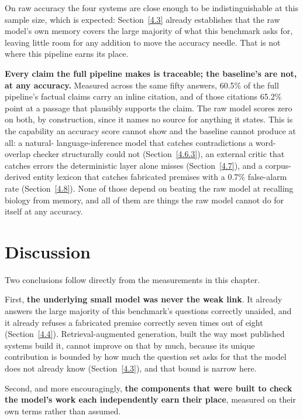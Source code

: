 On raw accuracy the four systems are close enough to be indistinguishable
at this sample size, which is expected: Section~\ref{4.3} already
establishes that the raw model's own memory covers the large majority of
what this benchmark asks for, leaving little room for any addition to
move the accuracy needle. That is not where this pipeline earns its
place.

\textbf{Every claim the full pipeline makes is traceable; the baseline's
are not, at any accuracy.} Measured across the same fifty answers, 60.5\%
of the full pipeline's factual claims carry an inline citation, and of
those citations 65.2\% point at a passage that plausibly supports the
claim. The raw model scores zero on both, by construction, since it names
no source for anything it states. This is the capability an accuracy
score cannot show and the baseline cannot produce at all: a natural-
language-inference model that catches contradictions a word-overlap
checker structurally could not (Section~\ref{4.6.3}), an external critic
that catches errors the deterministic layer alone misses
(Section~\ref{4.7}), and a corpus-derived entity lexicon that catches
fabricated premises with a 0.7\% false-alarm rate (Section~\ref{4.8}).
None of those depend on beating the raw model at recalling biology from
memory, and all of them are things the raw model cannot do for itself at
any accuracy.

\section{Discussion}\label{4.12}

Two conclusions follow directly from the measurements in this chapter.

First, \textbf{the underlying small model was never the weak link}. It
already answers the large majority of this benchmark's questions
correctly unaided, and it already refuses a fabricated premise correctly
seven times out of eight (Section~\ref{4.4}). Retrieval-augmented
generation, built the way most published systems build it, cannot improve
on that by much, because its unique contribution is bounded by how much
the question set asks for that the model does not already know
(Section~\ref{4.3}), and that bound is narrow here.

Second, and more encouragingly, \textbf{the components that were built to
check the model's work each independently earn their place}, measured on
their own terms rather than assumed.

